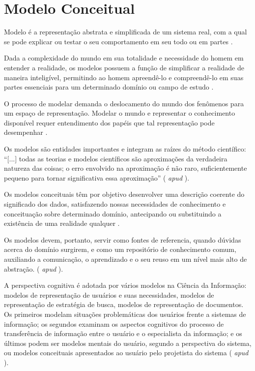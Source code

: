 

\chapter{\hspace*{3pt} Modelo Conceitual}
\label{chap:modeloConceitual}

Modelo é a representação abstrata e simplificada de um sistema real, com a qual se pode explicar ou testar o seu comportamento em seu todo ou em partes \citep{castro:2010.abordagem, cougo:1997.modelagem}.

Dada a complexidade do mundo em sua totalidade e necessidade do homem em entender a realidade, os modelos possuem a função de simplificar a realidade de maneira inteligível, permitindo ao homem apreendê-lo e compreendê-lo em suas partes essenciais para um determinado domínio ou campo de estudo \citep{almeida:2006.modelo, dodebei:2002.tesauro}.

O processo de modelar demanda o deslocamento do mundo dos fenômenos para um espaço de representação. Modelar o mundo e representar o conhecimento disponível requer entendimento dos papéis que tal representação pode desempenhar \citep{campos:2004.modelizacao}.

Os modelos são entidades importantes e integram as raízes do método científico: “[...] todas as teorias e modelos científicos são aproximações da verdadeira natureza das coisas; o erro envolvido na aproximação é não raro, suficientemente pequeno para tornar significativa essa aproximação” (\citealp[p.83]{capra:1983.tao} \textit{apud} \citealp{almeida:2006.modelo}).

Os modelos conceituais têm por objetivo desenvolver uma descrição coerente do significado dos dados, satisfazendo nossas necessidades de conhecimento e conceituação sobre determinado domínio, antecipando ou substituindo a existência de uma realidade qualquer \citep{higuchi:2012.representaccao}.

Os modelos devem, portanto, servir como fontes de referencia, quando dúvidas acerca do domínio surgirem, e como um repositório de conhecimento comum, auxiliando a comunicação, o aprendizado e o seu reuso em um nível mais alto de abstração. (\citealp{arango:1994.domain} \textit{apud} \citealp{guizzardi:2000.desenvolvimento}). 

A perspectiva cognitiva é adotada por vários modelos na Ciência da Informação: modelos de representação de usuários e suas necessidades, modelos de representação de estratégia de busca, modelos de representação de documentos. Os primeiros modelam situações problemáticas dos usuários frente a sistemas de informação; os segundos examinam os aspectos cognitivos do processo de transferência de informação entre o usuário e o especialista da informação; e os últimos podem ser modelos mentais do usuário, segundo a perspectiva do sistema, ou modelos conceituais apresentados ao usuário pelo projetista do sistema (\citealp{sayao:2001.modelos} \textit{apud} \citealp{almeida:2006.modelo}).

